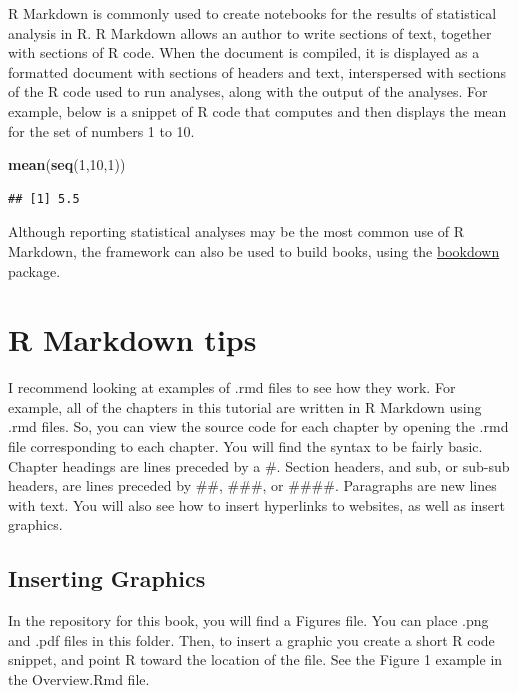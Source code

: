 \documentclass[]{book}
\newenvironment{Shaded}{\begin{snugshade}}{\end{snugshade}}
\newcommand{\KeywordTok}[1]{\textcolor[rgb]{0.13,0.29,0.53}{\textbf{#1}}}
\newcommand{\DecValTok}[1]{\textcolor[rgb]{0.00,0.00,0.81}{#1}}
\newcommand{\NormalTok}[1]{#1}
\begin{document}
R Markdown is commonly used to create notebooks for the results of
statistical analysis in R. R Markdown allows an author to write sections
of text, together with sections of R code. When the document is
compiled, it is displayed as a formatted document with sections of
headers and text, interspersed with sections of the R code used to run
analyses, along with the output of the analyses. For example, below is a
snippet of R code that computes and then displays the mean for the set
of numbers 1 to 10.

\begin{Shaded}
\begin{Highlighting}[]
\KeywordTok{mean}\NormalTok{(}\KeywordTok{seq}\NormalTok{(}\DecValTok{1}\NormalTok{,}\DecValTok{10}\NormalTok{,}\DecValTok{1}\NormalTok{))}
\end{Highlighting}
\end{Shaded}

\begin{verbatim}
## [1] 5.5
\end{verbatim}

Although reporting statistical analyses may be the most common use of R
Markdown, the framework can also be used to build books, using the
\href{https://bookdown.org/yihui/bookdown/}{bookdown} package.

\section{R Markdown tips}\label{r-markdown-tips}

I recommend looking at examples of .rmd files to see how they work. For
example, all of the chapters in this tutorial are written in R Markdown
using .rmd files. So, you can view the source code for each chapter by
opening the .rmd file corresponding to each chapter. You will find the
syntax to be fairly basic. Chapter headings are lines preceded by a \#.
Section headers, and sub, or sub-sub headers, are lines preceded by
\#\#, \#\#\#, or \#\#\#\#. Paragraphs are new lines with text. You will
also see how to insert hyperlinks to websites, as well as insert
graphics.

\subsection{Inserting Graphics}\label{inserting-graphics}

In the repository for this book, you will find a Figures file. You can
place .png and .pdf files in this folder. Then, to insert a graphic you
create a short R code snippet, and point R toward the location of the
file. See the Figure 1 example in the Overview.Rmd file.
\end{document}

